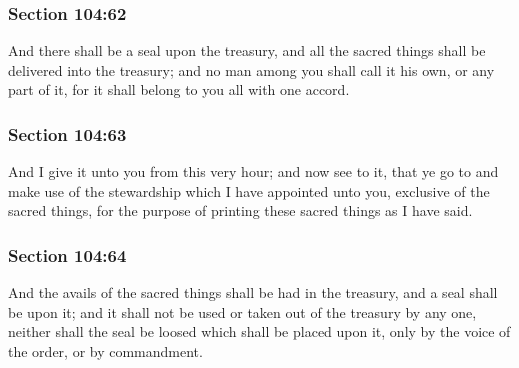 	\subsubsection{Section 104:62} %
		\label{DC104-62}

		And there shall be a seal upon the treasury, and all the sacred things shall be delivered into the treasury; and no man among you shall call it his own, or any part of it, for it shall belong to you all with one accord.


	\subsubsection{Section 104:63} %
		\label{DC104-63}

		And I give it unto you from this very hour; and now see to it, that ye go to and make use of the stewardship which I have appointed unto you, exclusive of the sacred things, for the purpose of printing these sacred things as I have said.


	\subsubsection{Section 104:64} %
		\label{DC104-64}

		And the avails of the sacred things shall be had in the treasury, and a seal shall be upon it; and it shall not be used or taken out of the treasury by any one, neither shall the seal be loosed which shall be placed upon it, only by the voice of the order, or by commandment.

